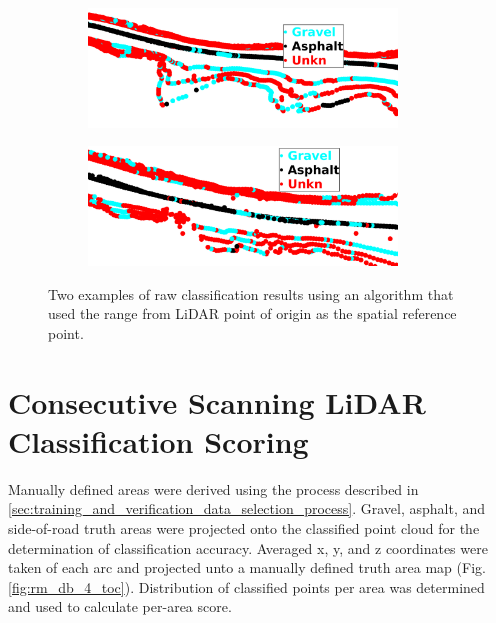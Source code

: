 \documentclass[numbered,pdftex]{ohio-etd}
\begin{document}
{{{		%
		\begin{figure}[H]
			\centering
			\begin{subfigure}[b]{\textwidth}
				\centering
				\includegraphics[width=0.9\textwidth]{Defense_Images/db_4_raw_range}
				\caption{}
				\label{fig:db_4_raw_range}
			\end{subfigure}
			\vspace{1cm} %
			\begin{subfigure}[b]{\textwidth}
				\centering
				\includegraphics[width=0.9\textwidth]{Defense_Images/db_6_raw_range}
				\caption{}
				\label{fig:db_6_raw_range}
			\end{subfigure}
			\caption[Raw Result Example - RANGE Spatial Reference Point]{Two examples of raw classification results using an algorithm that used the range from LiDAR point of origin as the spatial reference point. }
			\label{fig:range_raw_results_example}
		\end{figure}
		
	} %
	
	
	\section{Consecutive Scanning LiDAR Classification Scoring}\label{sec:consec_class_scoring}{
		
		{Manually defined areas were derived using the process described in \ref{sec:training_and_verification_data_selection_process}. Gravel, asphalt, and side-of-road truth areas were projected onto the classified point cloud for the determination of classification accuracy. Averaged x, y, and z coordinates were taken of each arc and projected unto a manually defined truth area map (Fig. \ref{fig:rm_db_4_toc}). Distribution of classified points per area was determined and used to calculate per-area score. }
	
}}}
\end{document}
